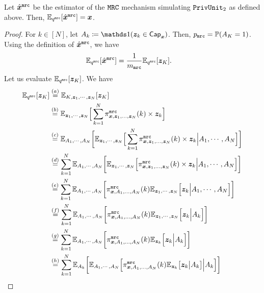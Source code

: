 

\begin{lemma}\label{theorem:mrc_privunit_bias}
Let $\hat{{\boldsymbol{x}}}^\texttt{mrc}$ be the estimator of the \emph{$\texttt{MRC}$} mechanism simulating \emph{$\texttt{PrivUnit}_2$} as defined above. Then, $\mathbb{E}_{q^{\texttt{mrc}}}[\hat{{\boldsymbol{x}}}^\texttt{mrc}] = {\boldsymbol{x}}$.
\end{lemma}
\begin{proof}
For $k \in [N]$, let $A_k \coloneqq \Indicator(\svbz_k \in \msf{Cap}_{\svbx})$. Then, $p_{\texttt{mrc}} = \mathbb{P}(A_K = 1)$. Using the definition of $\hat{{\boldsymbol{x}}}^\texttt{mrc}$, we have
\begin{align}
\mathbb{E}_{q^{\texttt{mrc}}} [\hat{{\boldsymbol{x}}}^\texttt{mrc}] & = \frac{1}{m_\texttt{mrc}} \mathbb{E}_{q^{\texttt{mrc}}} [{\boldsymbol{z}}_K ].
\end{align}
Let us evaluate $\mathbb{E}_{q^{\texttt{mrc}}} [{\boldsymbol{z}}_K ]$. We have
\begin{align}
\Expectation_{\qMRC} [\svbz_K ] & \stackrel{(a)}{=} \Expectation_{K, \svbz_1, \cdots, \svbz_N} [\svbz_K ] \\
& \stackrel{(b)}{=}  \Expectation_{\svbz_1, \cdots, \svbz_N} \Big[\sum_{k = 1}^{N}  \piMRC_{\svbx, \svbz_1,...,\svbz_N}(k) \times \svbz_k \Big] \\
& \stackrel{(c)}{=} \Expectation_{A_1, \cdots,A_N}\bigg[ \Expectation_{\svbz_1, \cdots, \svbz_N} \Big[\sum_{k = 1}^{N} \piMRC_{\svbx, \svbz_1,...,\svbz_N}(k) \times \svbz_k \Big| A_1, \cdots,A_N\Big]\bigg] \\
& \stackrel{(d)}{=} \sum_{k = 1}^{N} \Expectation_{A_1, \cdots,A_N}\bigg[   \Expectation_{\svbz_1, \cdots, \svbz_N} \Big[ \piMRC_{\svbx, \svbz_1,...,\svbz_N}(k) \times \svbz_k  \Big| A_1, \cdots,A_N\Big]\bigg] \\
& \stackrel{(e)}{=} \sum_{k = 1}^{N} \Expectation_{A_1, \cdots,A_N}\bigg[  \piMRC_{\svbx, A_1,...,A_N}(k) \Expectation_{\svbz_1, \cdots, \svbz_N} \Big[ \svbz_k  \Big| A_1, \cdots,A_N\Big]\bigg] \\
& \stackrel{(f)}{=} \sum_{k = 1}^{N} \Expectation_{A_1, \cdots,A_N}\bigg[\piMRC_{\svbx, A_1,...,A_N}(k) \Expectation_{\svbz_1, \cdots, \svbz_N} \Big[ \svbz_k  \Big| A_k \Big]\bigg] \\
& \stackrel{(g)}{=} \sum_{k = 1}^{N} \Expectation_{A_1, \cdots,A_N}\bigg[ \piMRC_{\svbx, A_1,...,A_N}(k) \Expectation_{\svbz_k} \Big[ \svbz_k  \Big| A_k\Big]\bigg] \\
& \stackrel{(h)}{=} \sum_{k = 1}^{N} \Expectation_{A_k} \bigg[\Expectation_{A_1, \cdots,A_N}\Big[ \piMRC_{\svbx, A_1,...,A_N}(k) \Expectation_{\svbz_k} \big[ \svbz_k  \big| A_k\big] \Big| A_k \Big] \bigg]\\

\end{align}
\end{proof}

